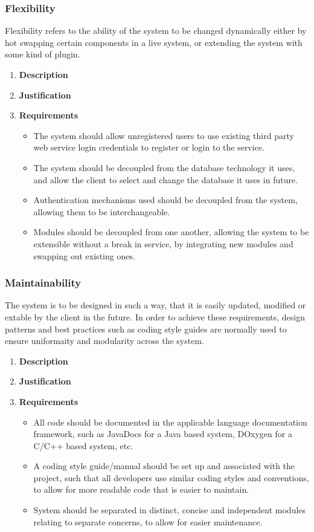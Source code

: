 \documentclass[a4paper,10pt]{article}
\begin{document}
\subsubsection{Flexibility}
Flexibility refers to the ability of the system to be changed dynamically either by hot swapping certain components in a live system, or extending the system with some kind of plugin. 
\begin{enumerate}
\item \textbf{Description}
\item \textbf{Justification}
\item \textbf{Requirements}
	\begin{itemize}
	\item The system should allow unregistered users to use existing third party web service login credentials to register or login to the service.
	\item The system should be decoupled from the database technology it uses, and allow the client to select and change the database it uses in future.
	\item Authentication mechanisms used should be decoupled from the system, allowing them to be interchangeable.
	\item Modules should be decoupled from one another, allowing the system to be extensible without a break in service, by integrating new modules and swapping out existing ones. 
	\end{itemize}
\end{enumerate}

\subsubsection{Maintainability}
The system is to be designed in such a way, that it is easily updated, modified or extable by the client in the future. In order to achieve these requirements, design patterns and best practices such as coding style guides are normally used to ensure uniformaity and modularity across the system.
\begin{enumerate}
\item \textbf{Description}
\item \textbf{Justification}
\item \textbf{Requirements}
	\begin{itemize}
		\item All code should be documented in the applicable language documentation framework, such as JavaDocs for a Java based system, DOxygen for a C/C++ based system, etc.
		\item A coding style guide/manual should be set up and associated with the project, such that all developers use similar coding styles and conventions, to allow for more readable code that is easier to maintain.
		\item System should be separated in distinct, concise and independent modules relating to separate concerns, to allow for easier maintenance.
	\end{itemize}
\end{enumerate}
\end{document}
